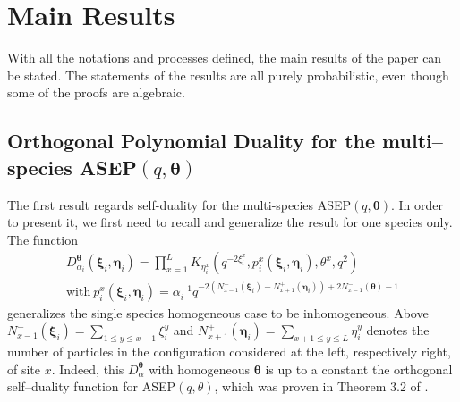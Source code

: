 \documentclass{ximera}
\begin{document}
\section{Main Results}\label{MR}
With all the notations and processes defined, the main results of the paper can be stated. The statements of the results are all purely probabilistic, even though some of the proofs are algebraic. 

\subsection{Orthogonal Polynomial Duality for the multi--species ASEP$(q,\boldsymbol{\theta})$}\label{OPD}
The first result regards self-duality for the multi-species ASEP$(q,\boldsymbol{\theta})$. In order to present it, we first need to recall and generalize the result for one species only.  
The function
\begin{align}\label{eq:4}
D_{\alpha_{i}}^{\boldsymbol{\theta}}\left(\boldsymbol\xi_{i},\boldsymbol\eta_{i}\right)=\prod_{x=1}^{L} K_{\eta_{i}^{x}}\left(q^{-2 \xi_{i}^{x}}, p_{i}^{x}\left(\boldsymbol\xi_{i}, \boldsymbol\eta_{i}\right), \theta^{x}, q^{2}\right) 
\\ \text{with} \ 
p_{i}^{x}\left(\boldsymbol\xi_{i}, \boldsymbol\eta_{i}\right)=\alpha_{i}^{-1} q^{-2\left(N_{x-1}^{-}\left(\boldsymbol\xi_{i}\right)-N_{x+1}^{+}\left(\boldsymbol\eta_{i}\right)\right)+2 N_{x-1}^{-}(\boldsymbol{\theta})-1} \nonumber
\end{align}
generalizes the single species homogeneous case to be inhomogeneous.
Above
$\displaystyle{N_{x-1}^{-}\left(\boldsymbol\xi_{i}\right)=\sum_{1\le y\le x-1} \xi_i^y} $ and $\displaystyle{N_{x+1}^{+}\left(\boldsymbol\eta_{i}\right)=\sum_{x+1\le y\le L}\eta_i^y }$ denotes the number of particles in the configuration considered at the left, respectively right, of  site $x$.
 Indeed, this $D_{\alpha}^{\boldsymbol{\theta}}$ with homogeneous $\boldsymbol\theta$ is up to a constant the orthogonal self--duality function for ASEP$(q,\theta)$, which was proven in Theorem 3.2 of \cite{ CFG21}.
\end{document}
